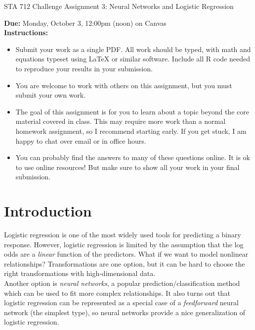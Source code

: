 \documentclass[11pt]{article}
\begin{document}
\begin{center}
\Large
STA 712 Challenge Assignment 3: Neural Networks and Logistic Regression\\
\normalsize
\vspace{5mm}
\end{center}

\noindent \textbf{Due:} Monday, October 3, 12:00pm (noon) on Canvas\\ 

\noindent \textbf{Instructions:} 
\begin{itemize}
\item Submit your work as a single PDF. All work should be typed, with math and equations typeset using LaTeX or similar software. Include all R code needed to reproduce your results in your submission.
\item You are welcome to work with others on this assignment, but you must submit your own work.
\item The goal of this assignment is for you to learn about a topic beyond the core material covered in class. This may require more work than a normal homework assignment, so I recommend starting early. If you get stuck, I am happy to chat over email or in office hours.
\item You can probably find the answers to many of these questions online. It is ok to use online resources! But make sure to show all your work in your final submission.
\end{itemize}

\section*{Introduction}

Logistic regression is one of the most widely used tools for predicting a binary response. However, logistic regression is limited by the assumption that the log odds are a \textit{linear} function of the predictors. What if we want to model nonlinear relationships? Transformations are one option, but it can be hard to choose the right transformations with high-dimensional data.\\

Another option is \textit{neural networks}, a popular prediction/classification method which can be used to fit more complex relationships. It also turns out that logistic regression can be represented as a special case of a \textit{feedforward} neural network (the simplest type), so neural networks provide a nice generalization of logistic regression.\\
\end{document}
